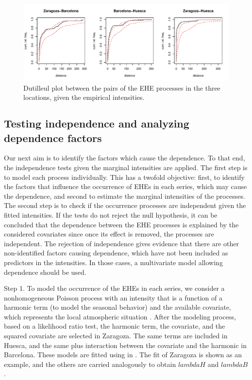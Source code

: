 	
	\begin{figure}[h]
		\includegraphics[width=14cm]{figure/Sev5-1} 
		\caption{Dutilleul plot between the pairs of  the EHE processes in the three locations,  given the empirical intensities. \label{FigDutilleul1}}
	\end{figure}
		

		
		
		
\subsection{Testing  independence and analyzing dependence factors}
		
Our next  aim is to   identify the factors which cause the  dependence. To that end, the  independence tests  given the marginal intensities are applied.		
The first step is to model  each  process individually. This has a twofold objective: first, to identify the factors that  influence the occurrence of EHEs  in each series, which may cause the dependence, and  second to  estimate the marginal intensities of the processes. The second step is to check if the  occurrence processes are independent given the fitted intensities. If the  tests  do not reject the null hypothesis, it can be concluded that the dependence between the EHE processes  is explained by the considered covariates since once  its effect is removed, the processes are independent.  The rejection of independence gives evidence that there are other non-identified factors  causing dependence, which have not been included  as predictors in the intensities.
In those cases,  a multivariate model allowing dependence should be used.
		
Step 1. To  model  the occurrence of the EHEs in each series, we  consider a nonhomogeneous Poisson process with an intensity  that is a  function of  a harmonic term  (to model the seasonal behavior) and the  available covariate, which represents the local atmospheric situation  \citep{Abaurrea15}. After the modeling process,  based on a likelihood ratio test, the harmonic term, the covariate,  and the squared covariate  are selected in  Zaragoza. The same terms  are included in Huesca,  and the same plus  interaction between the covariate and the harmonic in Barcelona. These models are fitted using   in . The fit of Zaragoza is shown as an example, and the others are carried analogously to obtain $lambdaH$ and $lambdaB$.
		
